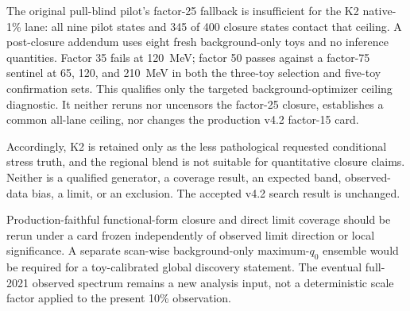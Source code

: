 The original pull-blind pilot's factor-25 fallback is insufficient for the K2
native-1\% lane: all nine pilot states and 345 of 400 closure states contact
that ceiling.  A post-closure addendum uses eight fresh background-only toys
and no inference quantities.  Factor 35 fails at 120~MeV; factor 50 passes
against a factor-75 sentinel at 65, 120, and 210~MeV in both the three-toy
selection and five-toy confirmation sets.  This qualifies only the targeted
background-optimizer ceiling diagnostic.  It neither reruns nor uncensors the
factor-25 closure, establishes a common all-lane ceiling, nor changes the
production v4.2 factor-15 card.

Accordingly, K2 is retained only as the less pathological requested
conditional stress truth, and the regional blend is not suitable for
quantitative closure claims.  Neither is a qualified generator, a coverage
result, an expected band, observed-data bias, a limit, or an exclusion.  The
accepted v4.2 search result is unchanged.

Production-faithful functional-form closure and direct limit coverage should be
rerun under a card frozen independently of observed limit direction or local
significance. A separate scan-wise
background-only maximum-$q_0$ ensemble would be required for a toy-calibrated global
discovery statement. The eventual full-2021 observed spectrum remains a new analysis
input, not a deterministic scale factor applied to the present 10\% observation.
